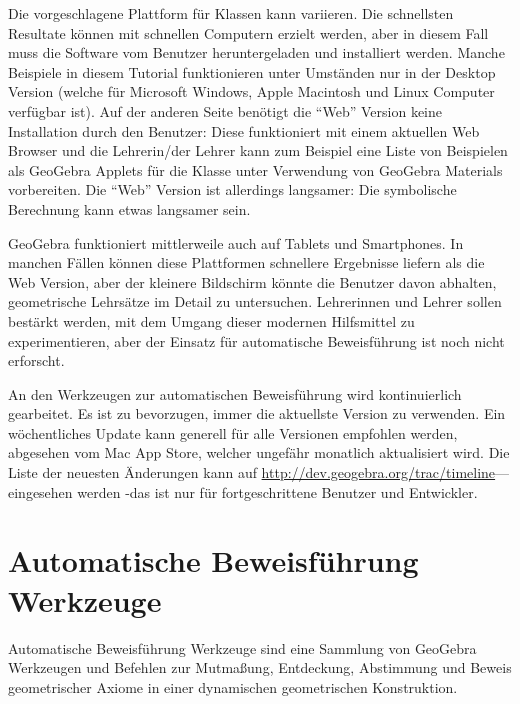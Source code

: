 \documentclass{article}
\begin{document}
Die vorgeschlagene Plattform für Klassen kann variieren. Die schnellsten Resultate können mit schnellen Computern erzielt werden, aber in diesem Fall muss die Software vom Benutzer heruntergeladen und installiert werden. Manche Beispiele in diesem Tutorial funktionieren unter Umständen nur in der \glqq{}Desktop\grqq{} Version (welche für Microsoft Windows, Apple Macintosh und Linux Computer verfügbar ist). Auf der anderen Seite benötigt die ``Web'' Version keine Installation durch den Benutzer: Diese funktioniert mit einem aktuellen Web Browser und die Lehrerin/der Lehrer kann zum Beispiel eine Liste von Beispielen als GeoGebra Applets für die Klasse unter Verwendung von GeoGebra Materials vorbereiten. Die ``Web'' Version ist allerdings langsamer: Die symbolische Berechnung kann etwas langsamer sein.

GeoGebra funktioniert mittlerweile auch auf Tablets und Smartphones. In manchen Fällen können diese Plattformen schnellere Ergebnisse liefern als die Web Version, aber der kleinere Bildschirm könnte die Benutzer davon abhalten, geometrische Lehrsätze im Detail zu untersuchen. Lehrerinnen und Lehrer sollen bestärkt werden, mit dem Umgang dieser modernen Hilfsmittel zu experimentieren, aber der Einsatz für automatische Beweisführung ist noch nicht erforscht.

An den Werkzeugen zur automatischen Beweisführung wird kontinuierlich gearbeitet. Es ist zu bevorzugen, immer die aktuellste Version zu verwenden. Ein wöchentliches Update kann generell für alle Versionen empfohlen werden, abgesehen vom Mac App Store, welcher ungefähr monatlich aktualisiert wird. Die Liste der neuesten Änderungen kann auf \url{http://dev.geogebra.org/trac/timeline}---eingesehen werden -das ist nur für fortgeschrittene Benutzer und Entwickler. 

\section{Automatische Beweisführung Werkzeuge}

Automatische Beweisführung Werkzeuge sind eine Sammlung von GeoGebra Werkzeugen und Befehlen zur Mutmaßung, Entdeckung, Abstimmung und Beweis geometrischer Axiome in einer dynamischen geometrischen Konstruktion.
\end{document}
